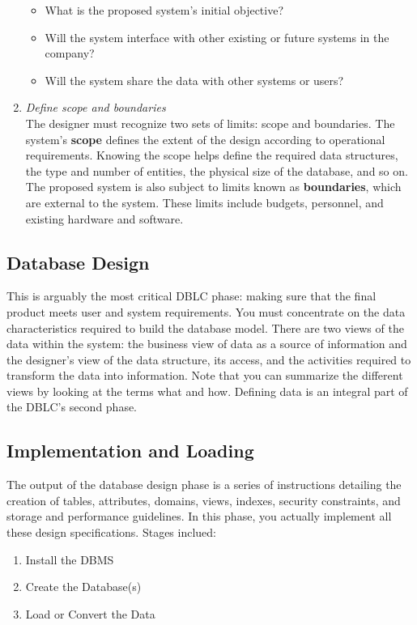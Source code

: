 \documentclass[a4paper, 12pt, titlepage]{report}
\begin{document}
\begin{enumerate}
\begin{itemize}
\item What is the proposed system’s initial objective?
\item Will the system interface with other existing or future systems in the company?
\item Will the system share the data with other systems or users?
\end{itemize}
\item \emph{Define scope and boundaries} \\
The designer must recognize two sets of limits: scope and boundaries. The system’s \textbf{scope} defines the extent of the design according to operational requirements. Knowing the scope helps define the required data structures, the type and number of entities, the physical size of the database, and so on. The proposed system is also subject to limits known as \textbf{boundaries}, which are external to the system. These limits include budgets, personnel, and existing hardware and software.
\end{enumerate}

\subsection{Database Design}
This is arguably the most critical DBLC phase: making sure that the final product meets user and system requirements. You must concentrate on the data characteristics required to build the database model. There are two views of the data within the system: the business view of data as a source of information and the designer’s view of the data structure, its access, and the activities required to transform the data into information. Note that you can summarize the different views by looking at the terms what and how. Defining data is an integral part of the DBLC’s second phase.

\subsection{Implementation and Loading}
The output of the database design phase is a series of instructions detailing the creation of tables, attributes, domains, views, indexes, security constraints, and storage and performance guidelines. In this phase, you actually implement all these design specifications. Stages inclued:
\begin{enumerate}
\item Install the DBMS
\item Create the Database(s)
\item Load or Convert the Data
\end{enumerate}
\end{document}

